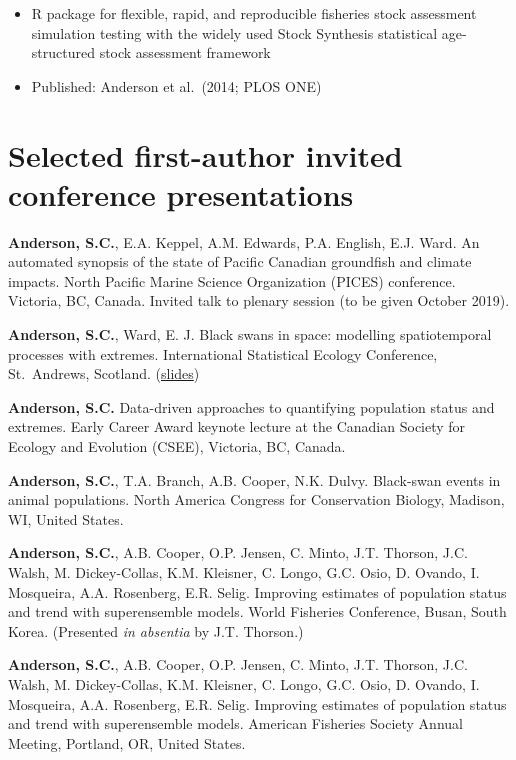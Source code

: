 \begin{itemize}
\tightlist
\item
  R package for flexible, rapid, and reproducible fisheries stock
  assessment simulation testing with the widely used Stock Synthesis
  statistical age-structured stock assessment framework
\item
  Published: Anderson et al.\ (2014; PLOS ONE)
\end{itemize}

\hypertarget{selected-first-author-invited-conference-presentations}{%
\section{Selected first-author invited conference
presentations}\label{selected-first-author-invited-conference-presentations}}

\begin{description}
\tightlist
\item[2019]
\textbf{Anderson, S.C.}, E.A. Keppel, A.M. Edwards, P.A. English, E.J.
Ward. An automated synopsis of the state of Pacific Canadian groundfish
and climate impacts. North Pacific Marine Science Organization (PICES)
conference. Victoria, BC, Canada. Invited talk to plenary session (to be
given October 2019).
\item[2018]
\textbf{Anderson, S.C.}, Ward, E. J. Black swans in space: modelling
spatiotemporal processes with extremes. International Statistical
Ecology Conference, St.\ Andrews, Scotland.
(\href{https://www.dropbox.com/s/ufce52ocpycftk1/anderson-ward-isec-2018.pdf?dl=1}{slides})
\item[2017]
\textbf{Anderson, S.C.} Data-driven approaches to quantifying population
status and extremes. Early Career Award keynote lecture at the Canadian
Society for Ecology and Evolution (CSEE), Victoria, BC, Canada.
\item[2016]
\textbf{Anderson, S.C.}, T.A. Branch, A.B. Cooper, N.K. Dulvy.
Black-swan events in animal populations. North America Congress for
Conservation Biology, Madison, WI, United States.
\item[2016]
\textbf{Anderson, S.C.}, A.B. Cooper, O.P. Jensen, C. Minto, J.T.
Thorson, J.C. Walsh, M. Dickey-Collas, K.M. Kleisner, C. Longo, G.C.
Osio, D. Ovando, I. Mosqueira, A.A. Rosenberg, E.R. Selig. Improving
estimates of population status and trend with superensemble models.
World Fisheries Conference, Busan, South Korea. (Presented \emph{in
absentia} by J.T. Thorson.)
\item[2015]
\textbf{Anderson, S.C.}, A.B. Cooper, O.P. Jensen, C. Minto, J.T.
Thorson, J.C. Walsh, M. Dickey-Collas, K.M. Kleisner, C. Longo, G.C.
Osio, D. Ovando, I. Mosqueira, A.A. Rosenberg, E.R. Selig. Improving
estimates of population status and trend with superensemble models.
American Fisheries Society Annual Meeting, Portland, OR, United States.
\end{description}

